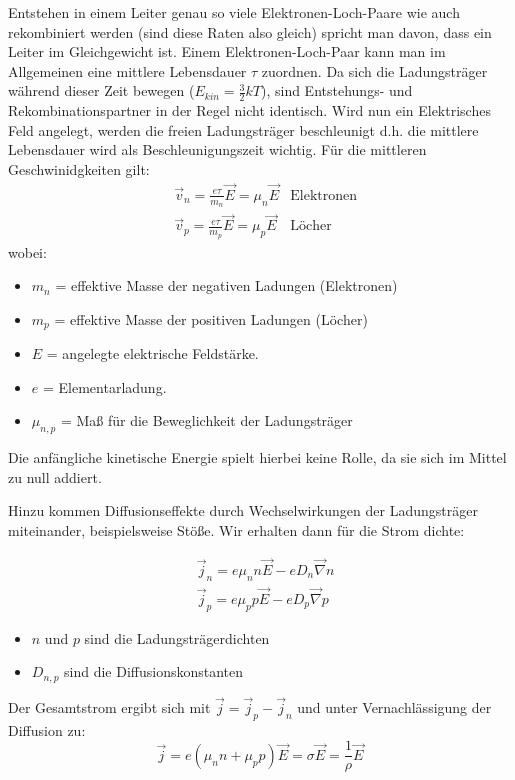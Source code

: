 \documentclass[12pt]{article}
\begin{document}
Entstehen in einem Leiter genau so viele Elektronen-Loch-Paare wie auch rekombiniert werden (sind diese Raten also gleich) spricht man davon, dass ein Leiter im Gleichgewicht ist. Einem Elektronen-Loch-Paar kann man im Allgemeinen eine mittlere Lebensdauer $\tau$ zuordnen. Da sich die Ladungsträger während dieser Zeit bewegen ($E_{kin} = \frac{3}{2}kT$), sind Entstehungs- und Rekombinationspartner in der Regel nicht identisch.  Wird nun ein Elektrisches Feld angelegt, werden die freien Ladungsträger beschleunigt d.h. die mittlere Lebensdauer wird als Beschleunigungszeit wichtig. Für die mittleren Geschwinidgkeiten gilt:
\begin{align*}
& \vec{v}_n=\frac{e\tau}{m_n}\vec{E}=\mu_n\vec{E}&\mbox{Elektronen}\\
& \vec{v}_p=\frac{e\tau}{m_p}\vec{E}=\mu_p\vec{E}&\mbox{Löcher}
\end{align*}
wobei:
\begin{itemize}
\item $m_n$ = effektive Masse der negativen Ladungen (Elektronen)
\item $m_p$ = effektive Masse der positiven Ladungen (Löcher)
\item $E$ = angelegte elektrische Feldstärke.
\item $e$ = Elementarladung.
\item $\mu_{n,p}$ = Maß für die Beweglichkeit der Ladungsträger
\end{itemize}

Die anfängliche kinetische Energie spielt hierbei keine Rolle, da sie sich im Mittel zu null addiert.

Hinzu kommen Diffusionseffekte durch Wechselwirkungen der Ladungsträger miteinander, beispielsweise Stöße. Wir erhalten dann für die Strom dichte:

\begin{align*}
&\vec{j}_n=e\mu_n n\vec{E}-eD_n\vec{\nabla}n\\
&\vec{j}_p=e\mu_p p\vec{E}-eD_p\vec{\nabla}p
\end{align*}
\begin{itemize}
\item $n$ und $p$ sind die Ladungsträgerdichten
\item $D_{n,p}$ sind die Diffusionskonstanten
\end{itemize}
Der Gesamtstrom ergibt sich mit $\vec{j}=\vec{j}_p-\vec{j}_n$ und unter Vernachlässigung der Diffusion zu:
\[\vec{j}=e(\mu_nn+\mu_pp)\vec{E}=\sigma\vec{E}=\frac{1}{\rho}\vec{E}\]
\end{document}
